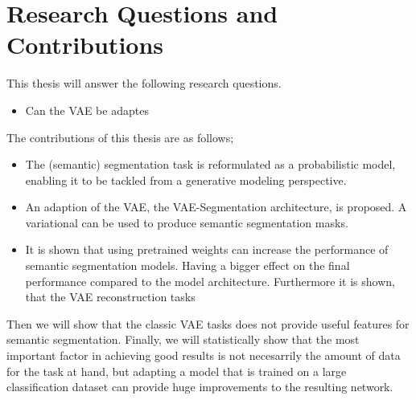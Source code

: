 \section{Research Questions and Contributions}
This thesis will answer the following research questions.
\begin{itemize}
    \item Can the VAE be adaptes
\end{itemize}
The contributions of this thesis are as follows;
\begin{itemize}
    \item The (semantic) segmentation task is reformulated as a probabilistic model, enabling it to be tackled from a generative modeling perspective.
    \item An adaption of the VAE, the VAE-Segmentation architecture, is proposed. A variational  can be used to produce semantic segmentation masks.
    \item It is shown that using pretrained weights can increase the performance of semantic segmentation models. Having a bigger effect on the final performance compared to the model architecture. Furthermore it is shown, that the VAE reconstruction tasks
\end{itemize}
Then we will show that the classic VAE tasks does not provide useful features for semantic segmentation. Finally, we will statistically show that the most important factor in achieving good results is not necesarrily the amount of data for the task at hand, but adapting a model that is trained on a large classification dataset can provide huge improvements to the resulting network. 
